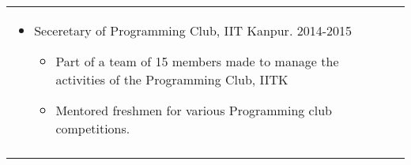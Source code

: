 \documentclass[a4paper]{article}
\begin{document}
\begin{longtable}{@{}m{3.0cm}m{14cm}@{}}
\begin{itemize}
                                                  \item Seceretary of Programming Club, IIT Kanpur. \hfill 2014-2015
                                                    \begin{itemize}
                                                      \item Part of a team of 15 members made to manage the activities of the Programming Club, IITK
                                                      \item Mentored freshmen for various Programming club competitions.
                                                      \end{itemize}
                                                  \end{itemize}

  \\ \\
\end{longtable}








\end{document}

